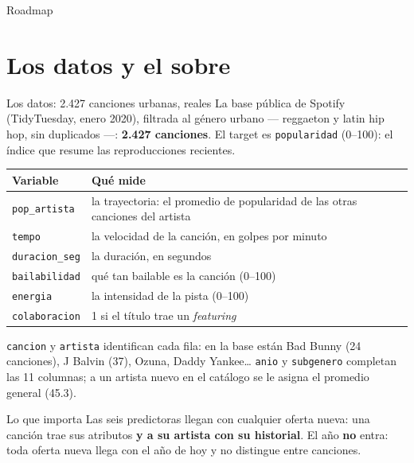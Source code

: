 \documentclass{beamer}
\begin{document}
\begin{frame}[noframenumbering]{Roadmap}
\tableofcontents
\end{frame}

\section{Los datos y el sobre}


\begin{frame}{Los datos: 2.427 canciones urbanas, reales}
\small
La base pública de Spotify (TidyTuesday, enero 2020), filtrada al género urbano --- reggaeton y latin hip hop, sin duplicados ---: \textbf{2.427 canciones}. El target es \texttt{popularidad} (0--100): el índice que resume las reproducciones recientes.

\vspace{0.05cm}
\begin{center}
\scriptsize
\setlength{\tabcolsep}{5pt}
\begin{tabular}{@{}l l@{}}
\toprule
\textbf{Variable} & \textbf{Qué mide} \\
\midrule
\texttt{pop\_artista} & la trayectoria: el promedio de popularidad de las otras canciones del artista \\
\texttt{tempo} & la velocidad de la canción, en golpes por minuto \\
\texttt{duracion\_seg} & la duración, en segundos \\
\texttt{bailabilidad} & qué tan bailable es la canción (0--100) \\
\texttt{energia} & la intensidad de la pista (0--100) \\
\texttt{colaboracion} & 1 si el título trae un \textit{featuring} \\
\bottomrule
\end{tabular}
\end{center}

\vspace{0.05cm}
\scriptsize \texttt{cancion} y \texttt{artista} identifican cada fila: en la base están Bad Bunny (24 canciones), J Balvin (37), Ozuna, Daddy Yankee\ldots{} \texttt{anio} y \texttt{subgenero} completan las 11 columnas; a un artista nuevo en el catálogo se le asigna el promedio general (45.3).
\small

\vspace{0.05cm}
\begin{alertblock}{Lo que importa}
Las seis predictoras llegan con cualquier oferta nueva: una canción trae sus atributos \textbf{y a su artista con su historial}. El año \textbf{no} entra: toda oferta nueva llega con el año de hoy y no distingue entre canciones.
\end{alertblock}
\end{frame}
\end{document}
